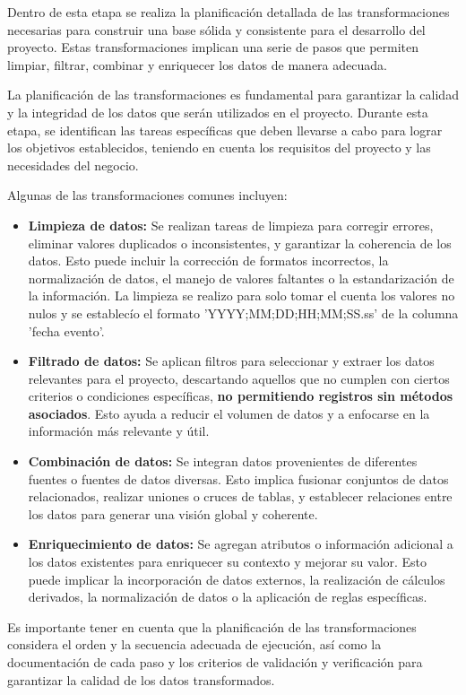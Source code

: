 Dentro de esta etapa se realiza la planificación detallada de las transformaciones necesarias para construir una base sólida y consistente para el desarrollo del proyecto. Estas transformaciones implican una serie de pasos que permiten limpiar, filtrar, combinar y enriquecer los datos de manera adecuada.

La planificación de las transformaciones es fundamental para garantizar la calidad y la integridad de los datos que serán utilizados en el proyecto. Durante esta etapa, se identifican las tareas específicas que deben llevarse a cabo para lograr los objetivos establecidos, teniendo en cuenta los requisitos del proyecto y las necesidades del negocio.

Algunas de las transformaciones comunes incluyen:

\begin{itemize}
    \item \textbf{Limpieza de datos:} Se realizan tareas de limpieza para corregir errores, eliminar valores duplicados o inconsistentes, y garantizar la coherencia de los datos. Esto puede incluir la corrección de formatos incorrectos, la normalización de datos, el manejo de valores faltantes o la estandarización de la información. La limpieza se realizo para solo tomar el cuenta los valores no nulos y se establecío el formato 'YYYY;MM;DD;HH;MM;SS.ss' de la columna 'fecha evento'.

    \item \textbf{Filtrado de datos:} Se aplican filtros para seleccionar y extraer los datos relevantes para el proyecto, descartando aquellos que no cumplen con ciertos criterios o condiciones específicas, \textbf{no permitiendo registros sin métodos asociados}. Esto ayuda a reducir el volumen de datos y a enfocarse en la información más relevante y útil.

    \item \textbf{Combinación de datos:} Se integran datos provenientes de diferentes fuentes o fuentes de datos diversas. Esto implica fusionar conjuntos de datos relacionados, realizar uniones o cruces de tablas, y establecer relaciones entre los datos para generar una visión global y coherente.

    \item \textbf{Enriquecimiento de datos:} Se agregan atributos o información adicional a los datos existentes para enriquecer su contexto y mejorar su valor. Esto puede implicar la incorporación de datos externos, la realización de cálculos derivados, la normalización de datos o la aplicación de reglas específicas.
\end{itemize}


Es importante tener en cuenta que la planificación de las transformaciones considera el orden y la secuencia adecuada de ejecución, así como la documentación de cada paso y los criterios de validación y verificación para garantizar la calidad de los datos transformados.

